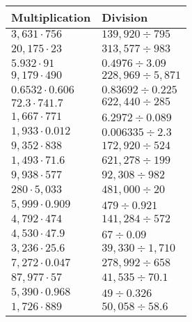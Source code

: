 \begin{longtable}[]{@{}ll@{}}
\toprule
Multiplication & Division\tabularnewline
\midrule
\endhead
\(3,631\cdot756\) & \(139,920÷795\)\tabularnewline
\(20,175\cdot23\) & \(313,577÷983\)\tabularnewline
\(5.932\cdot91\) & \(0.4976 ÷3.09\)\tabularnewline
\(9,179\cdot490\) & \(228,969÷5,871\)\tabularnewline
\(0.6532\cdot0.606\) & \(0.83692÷0.225\)\tabularnewline
\(72.3\cdot741.7\) & \(622,440÷285\)\tabularnewline
\(1,667\cdot771\) & \(6.2972÷0.089\)\tabularnewline
\(1,933\cdot0.012\) & \(0.006335÷2.3\)\tabularnewline
\(9,352\cdot838\) & \(172,920÷524\)\tabularnewline
\(1,493\cdot71.6\) & \(621,278÷199\)\tabularnewline
\(9,938\cdot577\) & \(92,308÷982\)\tabularnewline
\(280\cdot5,033\) & \(481,000÷20\)\tabularnewline
\(5,999\cdot0.909\) & \(479÷0.921\)\tabularnewline
\(4,792\cdot474\) & \(141,284÷572\)\tabularnewline
\(4,530\cdot47.9\) & \(67÷0.09\)\tabularnewline
\(3,236\cdot25.6\) & \(39,330÷1,710\)\tabularnewline
\(7,272\cdot0.047\) & \(278,992÷658\)\tabularnewline
\(87,977\cdot57\) & \(41,535÷70.1\)\tabularnewline
\(5,390\cdot0.968\) & \(49÷0.326\)\tabularnewline
\(1,726\cdot889\) & \(50,058÷58.6\)\tabularnewline
\bottomrule
\end{longtable}
